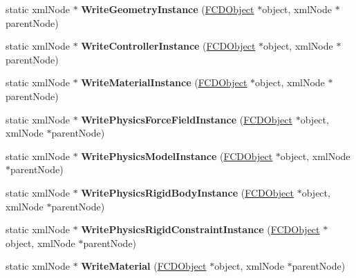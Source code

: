 \begin{DoxyCompactItemize}
\item 
\hypertarget{classFArchiveXML_aa7b0355376dd9371b9e737799c5d928e}{
static xmlNode $\ast$ {\bfseries WriteGeometryInstance} (\hyperlink{classFCDObject}{FCDObject} $\ast$object, xmlNode $\ast$parentNode)}
\label{classFArchiveXML_aa7b0355376dd9371b9e737799c5d928e}

\item 
\hypertarget{classFArchiveXML_ac08fda654194cba9b0ae862bc8250639}{
static xmlNode $\ast$ {\bfseries WriteControllerInstance} (\hyperlink{classFCDObject}{FCDObject} $\ast$object, xmlNode $\ast$parentNode)}
\label{classFArchiveXML_ac08fda654194cba9b0ae862bc8250639}

\item 
\hypertarget{classFArchiveXML_a4daabc243b617a14c153eb156f6ddf87}{
static xmlNode $\ast$ {\bfseries WriteMaterialInstance} (\hyperlink{classFCDObject}{FCDObject} $\ast$object, xmlNode $\ast$parentNode)}
\label{classFArchiveXML_a4daabc243b617a14c153eb156f6ddf87}

\item 
\hypertarget{classFArchiveXML_a5855343a9b949652a2724fe7cf875f79}{
static xmlNode $\ast$ {\bfseries WritePhysicsForceFieldInstance} (\hyperlink{classFCDObject}{FCDObject} $\ast$object, xmlNode $\ast$parentNode)}
\label{classFArchiveXML_a5855343a9b949652a2724fe7cf875f79}

\item 
\hypertarget{classFArchiveXML_a59df97ff9d45ab17e6da0901a994291b}{
static xmlNode $\ast$ {\bfseries WritePhysicsModelInstance} (\hyperlink{classFCDObject}{FCDObject} $\ast$object, xmlNode $\ast$parentNode)}
\label{classFArchiveXML_a59df97ff9d45ab17e6da0901a994291b}

\item 
\hypertarget{classFArchiveXML_a41b05d3777210a30a54e3df7adf70e66}{
static xmlNode $\ast$ {\bfseries WritePhysicsRigidBodyInstance} (\hyperlink{classFCDObject}{FCDObject} $\ast$object, xmlNode $\ast$parentNode)}
\label{classFArchiveXML_a41b05d3777210a30a54e3df7adf70e66}

\item 
\hypertarget{classFArchiveXML_a845d89ce4d972c6a6aca584142839d5a}{
static xmlNode $\ast$ {\bfseries WritePhysicsRigidConstraintInstance} (\hyperlink{classFCDObject}{FCDObject} $\ast$object, xmlNode $\ast$parentNode)}
\label{classFArchiveXML_a845d89ce4d972c6a6aca584142839d5a}

\item 
\hypertarget{classFArchiveXML_a587633d804ab70a3dc481b36e7777faf}{
static xmlNode $\ast$ {\bfseries WriteMaterial} (\hyperlink{classFCDObject}{FCDObject} $\ast$object, xmlNode $\ast$parentNode)}
\label{classFArchiveXML_a587633d804ab70a3dc481b36e7777faf}


\end{DoxyCompactItemize}
